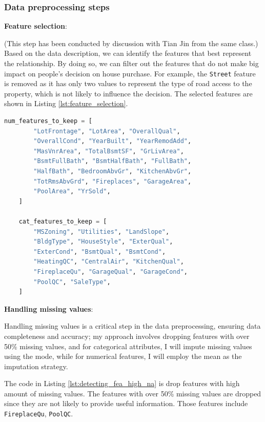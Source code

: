 \documentclass[10pt]{article}
\begin{document}
\subsubsection{Data preprocessing steps}

\textbf{Feature selection}: 

(This step has been conducted by discussion with Tian Jin from the same class.) Based on the data description, we can identify the features that best represent the relationship. By doing so, we can filter out the features that do not make big impact on people's decision on house purchase. For example, the \texttt{Street} feature is removed as it has only two values to represent the type of road access to the property, which is not likely to influence the decision. The selected features are shown in Listing \ref{lst:feature_selection}.

\begin{lstlisting}[language=Python, label={lst:feature_selection}, caption={Features selected with human knowledge}]
    num_features_to_keep = [
        "LotFrontage", "LotArea", "OverallQual",
        "OverallCond", "YearBuilt", "YearRemodAdd",
        "MasVnrArea", "TotalBsmtSF", "GrLivArea",
        "BsmtFullBath", "BsmtHalfBath", "FullBath",
        "HalfBath", "BedroomAbvGr", "KitchenAbvGr",
        "TotRmsAbvGrd", "Fireplaces", "GarageArea",
        "PoolArea", "YrSold",
    ]

    cat_features_to_keep = [
        "MSZoning", "Utilities", "LandSlope",
        "BldgType", "HouseStyle", "ExterQual",
        "ExterCond", "BsmtQual", "BsmtCond",
        "HeatingQC", "CentralAir", "KitchenQual",
        "FireplaceQu", "GarageQual", "GarageCond",
        "PoolQC", "SaleType",
    ]
\end{lstlisting}

\textbf{Handling missing values}: 

Handling missing values is a critical step in the data preprocessing, ensuring data completeness and accuracy; my approach involves dropping features with over 50\% missing values, and for categorical attributes, I will impute missing values using the mode, while for numerical features, I will employ the mean as the imputation strategy.

The code in Listing \ref{lst:detecting_fea_high_na} is drop features with high amount of missing values. The features with over 50\% missing values are dropped since they are not likely to provide useful information. Those features include \texttt{FireplaceQu}, \texttt{PoolQC}.
\end{document}
